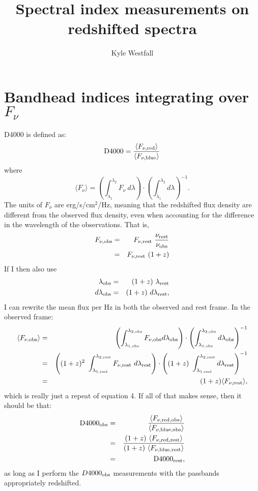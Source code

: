 \documentclass[a4paper]{article}
\title{Spectral index measurements on redshifted spectra}
\author{Kyle Westfall}
\begin{document}
\maketitle

\section{Bandhead indices integrating over $F_\nu$}

D4000 is defined as:
%
\begin{equation}
{\rm D4000} = \frac{\langle F_{\nu,{\rm red}}\rangle}{\langle F_{\nu,{\rm blue}}\rangle}
\end{equation}
%
where
%
\begin{equation}
\langle F_{\nu} \rangle = 
\left(\int^{\lambda_{2}}_{\lambda_{1}} F_\nu\ d\lambda\right) \cdot \left(\int^{\lambda_{2}}_{\lambda_{1}} d\lambda\right)^{-1}.
\end{equation}
%
The units of $F_{\nu}$ are erg/s/cm$^2$/Hz, meaning that the redshifted flux density are different from the observed flux density, even when accounting for the difference in the wavelength of the observations.  That is,
%
\begin{eqnarray}
F_{\nu,{\rm obs}} & = & F_{\nu,{\rm rest}}\ \frac{\nu_{\rm rest}}{\nu_{\rm obs}} \\
 & = & F_{\nu,{\rm rest}}\ (1+z)
 \end{eqnarray}
%
If I then also use
%
\begin{eqnarray}
\lambda_{\rm obs} & = & (1+z)\ \lambda_{\rm rest} \\
d\lambda_{\rm obs} & = & (1+z)\ d\lambda_{\rm rest},
\end{eqnarray}
%
I can rewrite the mean flux per Hz in both the observed and rest frame.  In the observed frame:
%
\begin{eqnarray}
\langle F_{\nu,{\rm obs}} \rangle & = &  
\left(\int^{\lambda_{2,{\rm obs}}}_{\lambda_{1,{\rm obs}}} F_{\nu,{\rm obs}} d\lambda_{\rm obs}\right) \cdot \left( \int^{\lambda_{2,{\rm obs}}}_{\lambda_{1,{\rm obs}}} d\lambda_{\rm obs} \right)^{-1} \\
& = &  
\left( (1+z)^2\ \int^{\lambda_{2,{\rm rest}}}_{\lambda_{1,{\rm rest}}} F_{\nu,{\rm rest}}\ d\lambda_{\rm rest}\right) \cdot \left( (1+z)\ \int^{\lambda_{2,{\rm rest}}}_{\lambda_{1,{\rm rest}}} d\lambda_{\rm rest}\right)^{-1} \\
& = & (1+z) \langle F_{\nu,{\rm rest}} \rangle,
\end{eqnarray}
%
which is really just a repeat of equation 4.  If all of that makes sense, then it should be that:
%
\begin{eqnarray}
{\rm D4000}_{\rm obs} & = & \frac{\langle F_{\nu,{\rm red,obs}}\rangle}{\langle F_{\nu,{\rm blue,obs}}\rangle} \\
 & = &  \frac{(1+z)\ \langle F_{\nu,{\rm red,rest}}\rangle}{(1+z)\ \langle F_{\nu,{\rm blue,rest}}\rangle} \\
 & = & {\rm D4000}_{\rm rest},
\end{eqnarray}
%
as long as I perform the $D4000_{\rm obs}$ measurements with the passbands appropriately redshifted.
\end{document}

